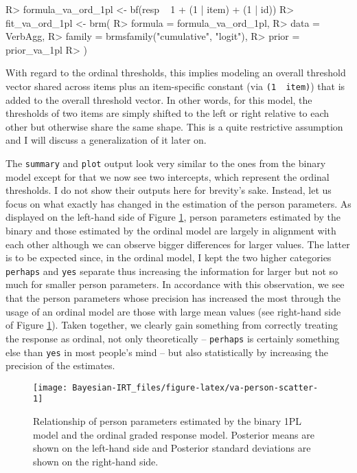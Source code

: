 \documentclass[
]{jss}
\begin{document}
\begin{CodeChunk}

\begin{CodeInput}
R> formula_va_ord_1pl <- bf(resp ~ 1 + (1 | item) + (1 | id))
R> fit_va_ord_1pl <- brm(
R>   formula = formula_va_ord_1pl,
R>   data = VerbAgg,
R>   family = brmsfamily("cumulative", "logit"),
R>   prior = prior_va_1pl
R> )
\end{CodeInput}
\end{CodeChunk}

With regard to the ordinal thresholds, this implies modeling an overall
threshold vector shared across items plus an item-specific constant (via
\texttt{(1\ \textbar{}\ item)}) that is added to the overall threshold
vector. In other words, for this model, the thresholds of two items are
simply shifted to the left or right relative to each other but otherwise
share the same shape. This is a quite restrictive assumption and I will
discuss a generalization of it later on.

The \texttt{summary} and \texttt{plot} output look very similar to the
ones from the binary model except for that we now see two intercepts,
which represent the ordinal thresholds. I do not show their outputs here
for brevity's sake. Instead, let us focus on what exactly has changed in
the estimation of the person parameters. As displayed on the left-hand
side of Figure \ref{fig:va-person-scatter}, person parameters estimated
by the binary and those estimated by the ordinal model are largely in
alignment with each other although we can observe bigger differences for
larger values. The latter is to be expected since, in the ordinal model,
I kept the two higher categories \texttt{perhaps} and \texttt{yes}
separate thus increasing the information for larger but not so much for
smaller person parameters. In accordance with this observation, we see
that the person parameters whose precision has increased the most
through the usage of an ordinal model are those with large mean values
(see right-hand side of Figure \ref{fig:va-person-scatter}). Taken
together, we clearly gain something from correctly treating the response
as ordinal, not only theoretically -- \texttt{perhaps} is certainly
something else than \texttt{yes} in most people's mind -- but also
statistically by increasing the precision of the estimates.

\begin{CodeChunk}
\begin{figure}

{\centering \texttt{[image: Bayesian-IRT\_files/figure-latex/va-person-scatter-1]} 

}

\caption[Relationship of person parameters estimated by the binary 1PL model and the ordinal graded response model]{Relationship of person parameters estimated by the binary 1PL model and the ordinal graded response model. Posterior means are shown on the left-hand side and Posterior standard deviations are shown on the right-hand side.}\label{fig:va-person-scatter}
\end{figure}
\end{CodeChunk}
\end{document}
